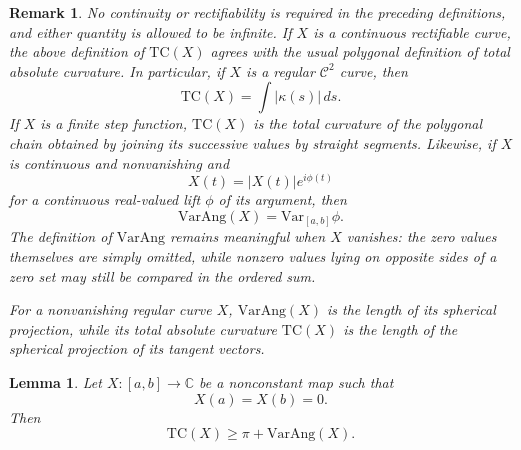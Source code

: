 \documentclass[10pt,a4paper]{amsart}
\newtheorem{lemma}[theorem]{Lemma}
\newtheorem{remark}[theorem]{Remark}
\newcommand{\T}{\mathrm{TC}}
\newcommand{\VA}{\mathrm{VarAng}}
\newcommand{\V}{\mathrm{Var}}
\newcommand{\cC}{\mathcal{C}}
\numberwithin{equation}{section}
\begin{document}
\begin{remark}\label{R1}
No continuity or rectifiability is required in the preceding definitions, and either quantity is allowed to be infinite. If $X$ is a continuous rectifiable curve, the above definition of $\T(X)$ agrees with the usual polygonal definition of total absolute curvature.  In particular, if $X$ is a regular $\cC^2$ curve, then
\[\T(X)=\int |\kappa(s)|\,ds.\]
If $X$ is a finite step function, $\T(X)$ is the total curvature of the polygonal chain obtained by joining its successive values by straight segments. Likewise, if $X$ is continuous and nonvanishing and
\[X(t)=|X(t)|e^{i\phi(t)}\]
for a continuous real-valued lift $\phi$ of its argument, then
\[\VA(X)=\V_{[a,b]}\phi.
\]
The definition of $\VA$ remains meaningful when
$X$ vanishes: the zero values themselves are simply omitted, while
nonzero values lying on opposite sides of a zero set may still be
compared in the ordered sum.

For a nonvanishing regular curve $X$, $\VA(X)$ is the length of its spherical projection, while its total absolute curvature $\T(X)$ is the length of the spherical projection of its tangent vectors.
\end{remark}

\begin{lemma}\label{L1} Let $X:[a,b]\to\mathbb C$ be a nonconstant map such that
\[X(a)=X(b)=0.\]
Then
\[\T(X)\ge\pi+\VA(X).\]
\end{lemma}
\end{document}
